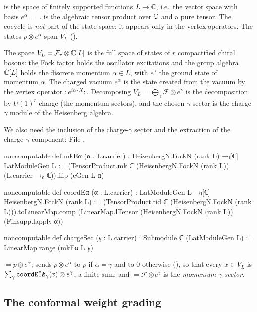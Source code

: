\begin{dictionary}
 is the space of finitely supported functions $L\to{\mathbb{C}}$, i.e.\ the vector
space with basis $e^\alpha=$ .  is the algebraic tensor
product over ${\mathbb{C}}$ and  a pure tensor. The cocycle is \emph{not} part of the
state space; it appears only in the vertex operators. The states $p\otimes e^\alpha$ span $V_L$
().
\end{dictionary}

\begin{physics}
The space $V_L=\mathcal F_r\otimes{\mathbb{C}}[L]$ is the full space of states of $r$ compactified chiral bosons: the Fock factor holds the oscillator excitations and the group algebra ${\mathbb{C}}[L]$ holds the discrete momentum $\alpha\in L$, with $e^\alpha$ the ground state of momentum $\alpha$. The charged vacuum $e^\alpha$ is the state created from the vacuum by the vertex operator $:\!e^{i\alpha\cdot X}\!:$. Decomposing $V_L=\bigoplus_\gamma\mathcal F\otimes e^\gamma$ is the decomposition by $U(1)^r$ charge (the momentum sectors), and the chosen $\gamma$ sector is the charge-$\gamma$ module of the Heisenberg algebra.
\end{physics}

We also need the inclusion of the charge-$\gamma$ sector and the extraction of the
charge-$\gamma$ component:
\noindent File .
\begin{leancode}
noncomputable def mkEα (α : L.carrier) : HeisenbergN.FockN (rank L) →ₗ[ℂ] LatModuleGen L :=
  (TensorProduct.mk ℂ (HeisenbergN.FockN (rank L)) (L.carrier →₀ ℂ)).flip (eGen L α)

noncomputable def coordEα (α : L.carrier) : LatModuleGen L →ₗ[ℂ] HeisenbergN.FockN (rank L) :=
  (TensorProduct.rid ℂ (HeisenbergN.FockN (rank L))).toLinearMap.comp
    (LinearMap.lTensor (HeisenbergN.FockN (rank L)) (Finsupp.lapply α))

noncomputable def chargeSec (γ : L.carrier) : Submodule ℂ (LatModuleGen L) :=
  LinearMap.range (mkEα L γ)
\end{leancode}
 $=p\otimes e^\alpha$;  sends $p\otimes e^{\alpha}$ to $p$ if
$\alpha=\gamma$ and to $0$ otherwise (), so that every $x\in V_L$ is
$\sum_\gamma\lean{coordEα}_\gamma(x)\otimes e^\gamma$, a finite sum; and 
$=\mathcal F\otimes e^\gamma$ is the \emph{momentum-$\gamma$ sector}.

\subsection{The conformal weight grading}

